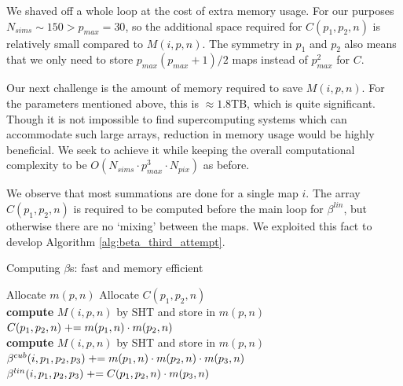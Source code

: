 We shaved off a whole loop at the cost of extra memory usage. For our purposes $N_{sims} \sim 150 > p_{max} = 30$, so the additional space required for $C(p_1,p_2,n)$ is relatively small compared to $M(i,p,n)$. The symmetry in $p_1$ and $p_2$ also means that we only need to store $p_{max}(p_{max}+1)/2$ maps instead of $p_{max}^2$ for $C$.

Our next challenge is the amount of memory required to save $M(i,p,n)$. For the parameters mentioned above, this is $\approx 1.8$TB, which is quite significant. Though it is not impossible to find supercomputing systems which can accommodate such large arrays, reduction in memory usage would be highly beneficial. We seek to achieve it while keeping the overall computational complexity to be $O(N_{sims} \cdot p_{max}^3 \cdot N_{pix})$ as before.

We observe that most summations are done for a single map $i$. The array $C(p_1,p_2,n)$ is required to be computed before the main loop for $\beta^{lin}$, but otherwise there are no `mixing' between the maps. We exploited this fact to develop Algorithm \ref{alg:beta_third_attempt}.

\begin{algorithm}[htbp]
	\caption{Computing $\beta$s: fast and memory efficient}
	\label{alg:beta_third_attempt}
	\begin{algorithmic}[1] %
		\State Allocate $m(p,n)$ 
		\State Allocate $C(p_1,p_2,n)$ 
		\\
				\State \textbf{compute} $M(i,p,n)$ by SHT and store in $m(p,n)$
			\EndFor
			\\
					\State $C(p_1,p_2,n) \mathrel{+}= m(p_1,n) \cdot m(p_2,n)$
				\EndFor
			\EndFor
		\EndFor
		\\
				\State \textbf{compute} $M(i,p,n)$ by SHT and store in $m(p,n)$
			\EndFor
			\\
					\label{alg:thrid_attempt_main_loop}	
					\State $\beta^{cub}(i, p_1, p_2, p_3) \mathrel{+}= m(p_1,n) \cdot m(p_2,n) \cdot m(p_3,n)$
					\State $\beta^{lin}(i, p_1, p_2, p_3) \mathrel{+}= C(p_1, p_2, n) \cdot m( p_3, n)$
				\EndFor
			\EndFor
		\EndFor
	\end{algorithmic}
\end{algorithm}

